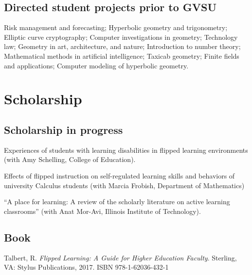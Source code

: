 \documentclass[letterpaper]{article}
\renewenvironment{itemize}{
  \begin{list}{}{
    \setlength{\leftmargin}{1.5em}
	\setlength{\itemsep}{0in}
  }
}{
  \end{list}
}
\begin{document}
\subsection*{Directed student projects prior to GVSU}

Risk management and forecasting; Hyperbolic geometry and trigonometry; Elliptic curve cryptography; Computer investigations in geometry; Technology law; Geometry in art, architecture, and nature; Introduction to number theory; Mathematical methods in artificial intelligence; Taxicab geometry; Finite fields and applications; Computer modeling of hyperbolic geometry.


\section*{Scholarship}

\subsection*{Scholarship in progress}
\begin{itemize}
	\item Experiences of students with learning disabilities in flipped learning environments (with Amy Schelling, College of Education).
	\item Effects of flipped instruction on self-regulated learning skills and behaviors of university Calculus students (with Marcia Frobish, Department of Mathematics)
	\item ``A place for learning: A review of the scholarly literature on active learning classrooms'' (with Anat Mor-Avi, Illinois Institute of Technology). 
\end{itemize}


\subsection*{Book}

\begin{itemize}
  \item Talbert, R. \textit{Flipped Learning: A Guide for Higher Education Faculty}. Sterling, VA: Stylus Publications, 2017. ISBN  978-1-62036-432-1
\end{itemize}
\end{document}
